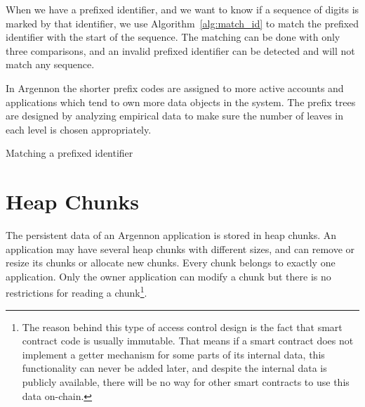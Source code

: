 When we have a prefixed identifier, and we want to know if a sequence of digits is marked by that identifier,
we use Algorithm~\ref{alg:match_id} to match the prefixed identifier with the start of the sequence. The matching
can be done with only three comparisons, and an invalid prefixed identifier can be detected and will not match
any sequence.

In Argennon the shorter prefix codes are assigned to more active accounts and applications which tend to own more
data objects in the system. The prefix trees are designed by analyzing empirical data to make sure the number
of leaves in each level is chosen appropriately.

\begin{algorithm}[h]
    \DontPrintSemicolon
    \BlankLine
    \BlankLine
    {
        {
            \;
        }
    }
    \;
    \caption{Matching a prefixed identifier}\label{alg:match_id}
\end{algorithm}


\section{Heap Chunks}\label{heap}

The persistent data of an Argennon application is stored in heap chunks. An application may have several heap chunks
with different sizes, and can remove or
resize its chunks or allocate new chunks. Every chunk belongs to exactly one application. Only the owner application can
modify a chunk but there is no restrictions for reading a chunk\footnote{The reason behind this type of access
control design is the fact that smart contract
code is usually immutable. That means if a smart contract does not implement a
getter mechanism for some parts of its internal data, this functionality can never
be added later, and despite the internal data is publicly available, there will be no
way for other smart contracts to use this data on-chain.}.

